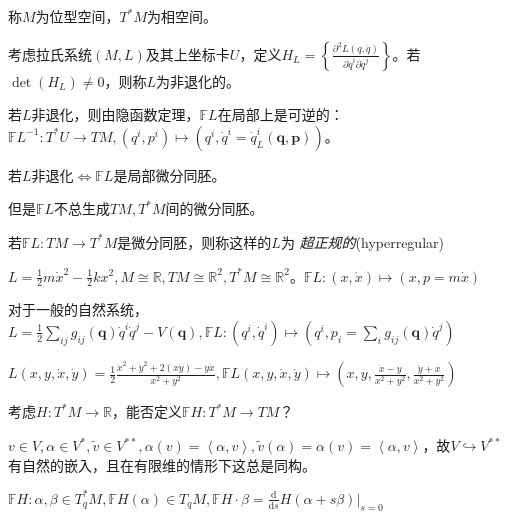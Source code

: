 \documentclass{ctexbook}
\begin{document}
称$M$为位型空间，$T^{*}M$为相空间。

\begin{Def}
  考虑拉氏系统$(M,L)$及其上坐标卡$U$，定义$H_L=\left\{ \frac{\partial^2 L(q,\dot{q}) }{\partial \dot{q}^i\partial \dot{q}^j} \right\}$。若$\det(H_L)\neq 0$，则称$L$为非退化的。
\end{Def}
若$L$非退化，则由隐函数定理，$\mathbb{F}L$在局部上是可逆的：$\mathbb{F}L^{-1}: T^{*}U\to TM, (q^i,p^i)\mapsto (q^i, \dot{q}^i=\dot{q}^i_L (\bm{q},\bm{p}))$。
\begin{Prop}
  若$L$非退化$\Leftrightarrow \mathbb{F}L$是局部微分同胚。
\end{Prop}

但是$\mathbb{F}L$不总生成$TM, T^{*}M$间的微分同胚。

\begin{Rmk}
  若$\mathbb{F}L:TM\to T^{*}M$是微分同胚，则称这样的$L$为 \textit{超正规的}(hyperregular)
\end{Rmk}


\begin{Eg}
  $L=\frac{1}{2} m \dot{x}^2-\frac{1}{2}kx^2, M\cong  \mathbb{R}, TM\cong \mathbb{R}^2, T^{*}M\cong \mathbb{R}^2$。$\mathbb{F}L:(x,\dot{x})\mapsto (x, p=m\dot{x})$
\end{Eg}

\begin{Eg}
  对于一般的自然系统，$L=\frac{1}{2}\sum\limits_{ij}^{}g_{ij}(\bm{q})\dot{q}^i \dot{q}^j -V(\bm{q}), \mathbb{F}L:(q^i, \dot{q}^i)\mapsto (q^i, p_i= \sum_i g_{ij}(\bm{q}) \dot{q}^j)$
\end{Eg}

\begin{Eg}
  $L(x,y, \dot{x},\dot{y})=\frac{1}{2}\frac{\dot{x}^2+ \dot{y}^2 + 2(x \dot{y})-y\dot{x}}{x^2+y^2}, \mathbb{F}L(x,y,\dot{x},\dot{y})\mapsto (x,y, \frac{\dot{x}-y}{x^2+y^2}, \frac{\dot{y}+x}{x^2+y^2})$
\end{Eg}

考虑$H: T^{*}M\to \mathbb{R}$，能否定义$\mathbb{F}H: T^{*}M\to TM$？

$v\in V, \alpha\in V^{*}, \tilde{v}\in V^{**}, \alpha(v)= \left\langle \alpha,v \right\rangle, \tilde{v}(\alpha)= \alpha(v)=\left\langle \alpha,v \right\rangle$，故$V\hookrightarrow V^{**}$有自然的嵌入，且在有限维的情形下这总是同构。

\begin{Def}
  $\mathbb{F}H: \alpha, \beta\in T^{*}_qM, \mathbb{F} H(\alpha)\in T_qM, \mathbb{F}H \cdot \beta= \frac{\mathrm{d}}{\mathrm{d}s}H(\alpha+s\beta)|_{s=0}$
\end{Def}
\end{document}
